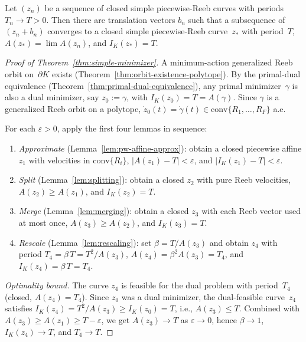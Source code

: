 \begin{lemma}\label{lem:compactness}
Let $(z_n)$ be a sequence of closed simple
piecewise-Reeb curves with periods $T_n \to T > 0$.
Then there are translation vectors $b_n$ such that a subsequence of
$(z_n + b_n)$ converges to a closed simple piecewise-Reeb curve~$z_*$
with period~$T$, $A(z_*) = \lim A(z_n)$, and $I_K(z_*) = T$.
\end{lemma}


\begin{proof}[Proof of Theorem~\ref{thm:simple-minimizer}]
A minimum-action generalized Reeb orbit on~$\partial K$ exists
(Theorem~\ref{thm:orbit-existence-polytope}).
By the primal-dual equivalence
(Theorem~\ref{thm:primal-dual-equivalence}),
any primal minimizer~$\gamma$ is also a dual minimizer,
say $z_0 := \gamma$, with
$I_K(z_0) = T = A(\gamma)$.
Since $\gamma$ is a generalized Reeb orbit on a polytope,
$\dot{z}_0(t) = \dot{\gamma}(t)
  \in \mathrm{conv}\{R_1, \ldots, R_F\}$ a.e.

For each $\varepsilon > 0$, apply the first four lemmas in sequence:
\begin{enumerate}
\item \emph{Approximate}
  (Lemma~\ref{lem:pw-affine-approx}):
  obtain a closed piecewise affine $z_1$
  with velocities in $\mathrm{conv}\{R_i\}$,
  $|A(z_1) - T| < \varepsilon$, and
  $|I_K(z_1) - T| < \varepsilon$.

\item \emph{Split}
  (Lemma~\ref{lem:splitting}):
  obtain a closed $z_2$ with pure Reeb velocities,
  $A(z_2) \geq A(z_1)$, and $I_K(z_2) = T$.

\item \emph{Merge}
  (Lemma~\ref{lem:merging}):
  obtain a closed $z_3$ with each Reeb vector
  used at most once,
  $A(z_3) \geq A(z_2)$, and $I_K(z_3) = T$.

\item \emph{Rescale}
  (Lemma~\ref{lem:rescaling}):
  set $\beta = T / A(z_3)$ and obtain $z_4$ with
  period $T_4 = \beta\, T = T^2 / A(z_3)$,
  $A(z_4) = \beta^2 A(z_3) = T_4$, and
  $I_K(z_4) = \beta\, T = T_4$.
\end{enumerate}

\emph{Optimality bound.}
The curve $z_4$ is feasible for the dual problem
with period~$T_4$
(closed, $A(z_4) = T_4$).
Since $z_0$ was a dual minimizer, the dual-feasible
curve~$z_4$ satisfies
$I_K(z_4) = T^2 / A(z_3) \geq I_K(z_0) = T$,
i.e., $A(z_3) \leq T$.
Combined with $A(z_3) \geq A(z_1) \geq T - \varepsilon$,
we get $A(z_3) \to T$ as $\varepsilon \to 0$,
hence $\beta \to 1$, $I_K(z_4) \to T$, and $T_4 \to T$.


\end{proof}
